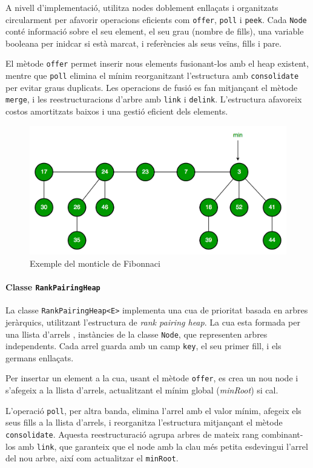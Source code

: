 \documentclass{ieeetj}
\begin{document}
A nivell d'implementació, utilitza nodes doblement enllaçats i organitzats circularment per afavorir operacions eficients com \texttt{offer}, \texttt{poll} i \texttt{peek}. \newline
Cada \texttt{Node} conté informació sobre el seu element, el seu grau (nombre de fills), una variable booleana per inidcar si està marcat, i referències als seus veïns, fills i pare. \newline

El mètode \texttt{offer} permet inserir nous elements fusionant-los amb el heap existent, mentre que \texttt{poll} elimina el mínim reorganitzant l'estructura amb \texttt{consolidate} per evitar graus duplicats. Les operacions de fusió es fan mitjançant el mètode \texttt{merge}, i les reestructuracions d'arbre amb \texttt{link} i \texttt{delink}. L'estructura afavoreix costos amortitzats baixos i una gestió eficient dels elements.
\begin{figure}[H]
    \centering
    \includegraphics[width=0.5\linewidth]{png/Fibonacci-Heap.png}
    \caption{Exemple del monticle de Fibonnaci}
    \label{fig:enter-label}
\end{figure}


\paragraph{Classe \texttt{RankPairingHeap}}  
La classe \texttt{RankPairingHeap<E>} implementa una cua de prioritat basada en arbres jeràrquics, utilitzant l'estructura de \textit{rank pairing heap}. 
La cua esta formada per  una llista d'arrels , instàncies de la classe \texttt{Node}, que representen arbres independents.
Cada arrel guarda amb un camp \texttt{key}, el seu primer fill, i els germans enllaçats.\newline 

Per insertar un element a la cua, usant el mètode  \texttt{offer}, es crea un nou node i s’afegeix a la llista d’arrels, actualitzant el mínim global (\textit{minRoot}) si cal. \newline 

L’operació \texttt{poll}, per altra banda,  elimina l’arrel amb el valor mínim, afegeix els seus fills a la llista d’arrels, i reorganitza l’estructura mitjançant el mètode \texttt{consolidate}. Aquesta reestructuració agrupa arbres de mateix rang combinant-los amb \texttt{link}, que garanteix que el node amb la clau més petita esdevingui l’arrel del nou arbre, així com  actualitzar el  \texttt{minRoot}. \newline 
\end{document}
